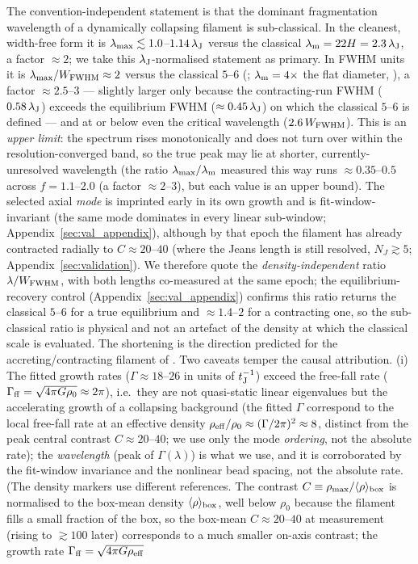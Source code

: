 \documentclass[usenatbib,twoside,twocolumn]{mnras}
\begin{document}
The convention-independent statement is that the dominant fragmentation wavelength of a dynamically collapsing filament is sub-classical. In the cleanest, width-free form it is $\lambda_{\rm max}\lesssim1.0$--$1.14\,\lambda_{\rm J}$ versus the classical $\lambda_{\rm m}=22H=2.3\,\lambda_{\rm J}$, a factor $\approx2$; we take this $\lambda_{\rm J}$-normalised statement as primary. In FWHM units it is $\lambda_{\rm max}/W_{\rm FWHM}\approx2$ versus the classical $5$--$6$ (\citealt{Fischera2012}; $\lambda_{\rm m}=4\times$ the flat diameter, \citealt{Inutsuka1992}), a factor $\approx2.5$--$3$ --- slightly larger only because the contracting-run FWHM ($0.58\,\lambda_{\rm J}$) exceeds the equilibrium FWHM ($\approx0.45\,\lambda_{\rm J}$) on which the classical $5$--$6$ is defined --- and at or below even the critical wavelength ($2.6\,W_{\rm FWHM}$). This is an \emph{upper limit}: the spectrum rises monotonically and does not turn over within the resolution-converged band, so the true peak may lie at shorter, currently-unresolved wavelength (the ratio $\lambda_{\rm max}/\lambda_{\rm m}$ measured this way runs $\approx0.35$--$0.5$ across $f=1.1$--$2.0$ (a factor $\approx2$--$3$), but each value is an upper bound). The selected axial \emph{mode} is imprinted early in its own growth and is fit-window-invariant (the same mode dominates in every linear sub-window; Appendix~\ref{sec:val_appendix}), although by that epoch the filament has already contracted radially to $C\approx20$--$40$ (where the Jeans length is still resolved, $N_J\gtrsim5$; Appendix~\ref{sec:validation}). We therefore quote the \emph{density-independent} ratio $\lambda/W_{\rm FWHM}$, with both lengths co-measured at the same epoch; the equilibrium-recovery control (Appendix~\ref{sec:val_appendix}) confirms this ratio returns the classical $5$--$6$ for a true equilibrium and $\approx1.4$--$2$ for a contracting one, so the sub-classical ratio is physical and not an artefact of the density at which the classical scale is evaluated. The shortening is the direction predicted for the accreting/contracting filament of \citet{Clarke2016,Clarke2017}. Two caveats temper the causal attribution. (i) The fitted growth rates ($\Gamma\approx18$--$26$ in units of $t_{\rm J}^{-1}$) exceed the free-fall rate ($\Gamma_{\rm ff}=\sqrt{4\pi G\rho_0}\approx2\pi$), i.e.\ they are not quasi-static linear eigenvalues but the accelerating growth of a collapsing background (the fitted $\Gamma$ correspond to the local free-fall rate at an effective density $\rho_{\rm eff}/\rho_0\approx(\Gamma/2\pi)^2\approx8$, distinct from the peak central contrast $C\approx20$--$40$; we use only the mode \emph{ordering}, not the absolute rate); the \emph{wavelength} (peak of $\Gamma(\lambda)$) is what we use, and it is corroborated by the fit-window invariance and the nonlinear bead spacing, not the absolute rate. (The density markers use different references. The contrast $C\equiv\rho_{\rm max}/\langle\rho\rangle_{\rm box}$ is normalised to the box-mean density $\langle\rho\rangle_{\rm box}$, well below $\rho_0$ because the filament fills a small fraction of the box, so the box-mean $C\approx20$--$40$ at measurement (rising to $\gtrsim100$ later) corresponds to a much smaller on-axis contrast; the growth rate $\Gamma_{\rm ff}=\sqrt{4\pi G\rho_{\rm eff}}$ 
\end{document}
